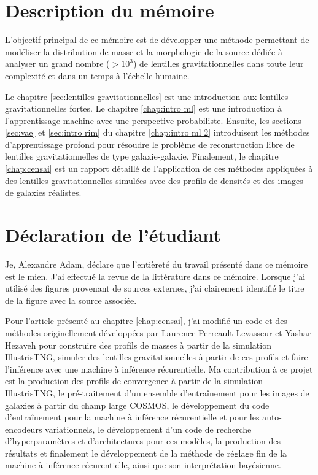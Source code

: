 \section{Description du mémoire}

L'objectif principal de ce mémoire est de développer une méthode permettant de 
modéliser la distribution de masse et 
la morphologie de la source dédiée à analyser un grand nombre ($> 10^{3}$)
de lentilles gravitationnelles dans toute leur complexité et dans un temps à l'échelle humaine. 

Le chapitre \ref{sec:lentilles gravitationnelles} est une introduction aux lentilles gravitationnelles fortes. Le chapitre \ref{chap:intro ml} est 
une introduction à l'apprentissage machine avec une perspective probabiliste. Ensuite, 
les sections \ref{sec:vae} et \ref{sec:intro rim} du chapitre \ref{chap:intro ml 2} introduisent les méthodes d'apprentissage profond 
pour résoudre le problème de reconstruction libre de lentilles gravitationnelles de type galaxie-galaxie. 
Finalement, le chapitre \ref{chap:censai} est un rapport détaillé de l'application de ces méthodes 
appliquées à des lentilles gravitationnelles simulées 
avec des profils de densités et des images de galaxies réalistes.

\section{Déclaration de l'étudiant}
Je, Alexandre Adam, déclare que l'entièreté du travail présenté dans ce mémoire est le mien. J'ai effectué la revue de 
la littérature dans ce mémoire. Lorsque j'ai utilisé des figures provenant de sources externes, j'ai clairement 
identifié le titre de la figure avec la source associée.

Pour l'article présenté au chapitre \ref{chap:censai}, j'ai modifié un code et des méthodes originellement 
développées par Laurence Perreault-Levasseur et Yashar Hezaveh pour construire des profils de masses à partir 
de la simulation IllustrisTNG, simuler des lentilles gravitationnelles à partir de ces profils et faire l'inférence avec une 
machine à inférence récurentielle. Ma contribution à ce projet est la 
production des profils de convergence à partir de la simulation IllustrisTNG, le pré-traitement 
d'un ensemble d'entraînement pour les images de galaxies à partir du champ large COSMOS, le 
développement du code d'entraînement pour la machine à inférence récurentielle et pour les auto-encodeurs 
variationnels, le développement d'un code de recherche d'hyperparamètres et d'architectures pour ces modèles, 
la production des résultats et finalement 
le développement de la méthode de réglage fin de la machine à inférence récurentielle, 
ainsi que son interprétation bayésienne.

